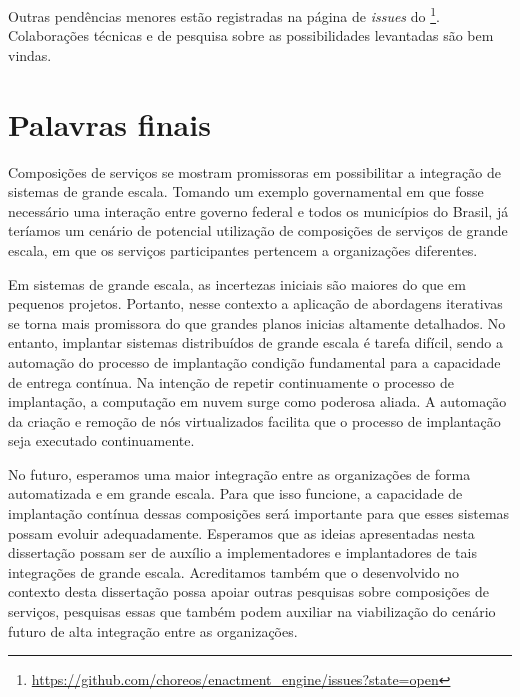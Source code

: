 Outras pendências menores estão registradas na página de \emph{issues} 
do \ee\footnote{\url{https://github.com/choreos/enactment_engine/issues?state=open}}.
Colaborações técnicas e de pesquisa sobre as possibilidades levantadas
são bem vindas.


\section{Palavras finais}

Composições de serviços se mostram promissoras
em possibilitar a integração de sistemas de grande escala.
Tomando um exemplo governamental em que fosse necessário
uma interação entre governo federal e todos os municípios do Brasil,
já teríamos um cenário de potencial utilização de composições
de serviços de grande escala, em que os serviços participantes
pertencem a organizações diferentes.

Em sistemas de grande escala, as incertezas iniciais são maiores do que
em pequenos projetos. Portanto, nesse contexto a aplicação de abordagens iterativas se torna
mais promissora do que grandes planos inicias altamente detalhados. 
No entanto, implantar sistemas distribuídos de grande escala é tarefa difícil,
sendo a automação do processo de implantação condição fundamental
para a capacidade de entrega contínua.
Na intenção de repetir continuamente o processo de implantação,
a computação em nuvem surge como poderosa aliada.
A automação da criação e remoção de nós virtualizados facilita que o
processo de implantação seja executado continuamente. 

No futuro, esperamos uma maior integração entre as organizações 
de forma automatizada e em grande escala.
Para que isso funcione, a capacidade de implantação contínua
dessas composições será importante para que esses sistemas
possam evoluir adequadamente.
Esperamos que as ideias apresentadas nesta dissertação
possam ser de auxílio a implementadores e implantadores
de tais integrações de grande escala.
Acreditamos também que o \ee desenvolvido no contexto desta dissertação
possa apoiar outras pesquisas sobre composições de serviços, 
pesquisas essas que também podem auxiliar
na viabilização do cenário futuro de alta integração entre as organizações. 


